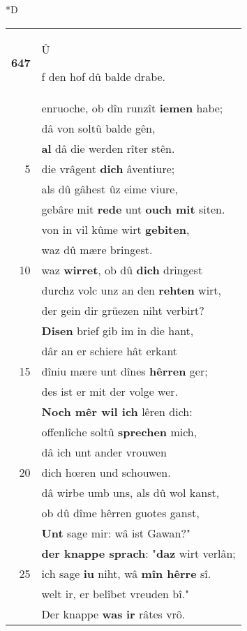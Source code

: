 \documentclass[8pt,a4paper,notitlepage]{article}
\begin{document}
\begin{table}[ht]
\begin{minipage}[t]{0.5\linewidth}
\small
\begin{center}*D
\end{center}
\begin{tabular}{rl}
\textbf{647} & \begin{large}Û\end{large}f den hof dû balde drabe.\\ 
 & enruoche, ob dîn runzît \textbf{iemen} habe;\\ 
 & dâ von soltû balde gên,\\ 
 & \textbf{al} dâ die werden rîter stên.\\ 
5 & die vrâgent \textbf{dich} âventiure;\\ 
 & als dû gâhest ûz eime viure,\\ 
 & gebâre mit \textbf{rede} unt \textbf{ouch mit} siten.\\ 
 & von in vil kûme wirt \textbf{gebiten},\\ 
 & waz dû mære bringest.\\ 
10 & waz \textbf{wirret}, ob dû \textbf{dich} dringest\\ 
 & durchz volc unz an den \textbf{rehten} wirt,\\ 
 & der gein dir grüezen niht verbirt?\\ 
 & \textbf{Disen} brief gib im in die hant,\\ 
 & dâr an er schiere hât erkant\\ 
15 & dîniu mære unt dînes \textbf{hêrren} ger;\\ 
 & des ist er mit der volge wer.\\ 
 & \textbf{Noch mêr wil ich} lêren dich:\\ 
 & offenlîche soltû \textbf{sprechen} mich,\\ 
 & dâ ich unt ander vrouwen\\ 
20 & dich hœren und schouwen.\\ 
 & dâ wirbe umb uns, als dû wol kanst,\\ 
 & ob dû dîme hêrren guotes ganst,\\ 
 & \textbf{Unt} sage mir: wâ ist Gawan?"\\ 
 & \textbf{der knappe sprach}: "\textbf{daz} wirt verlân;\\ 
25 & ich sage \textbf{iu} niht, wâ \textbf{mîn hêrre} sî.\\ 
 & welt ir, er belîbet vreuden bî."\\ 
 & Der knappe \textbf{was} \textbf{ir} râtes vrô.\\ 

\end{tabular}
\end{minipage}
\end{table}
\end{document}
